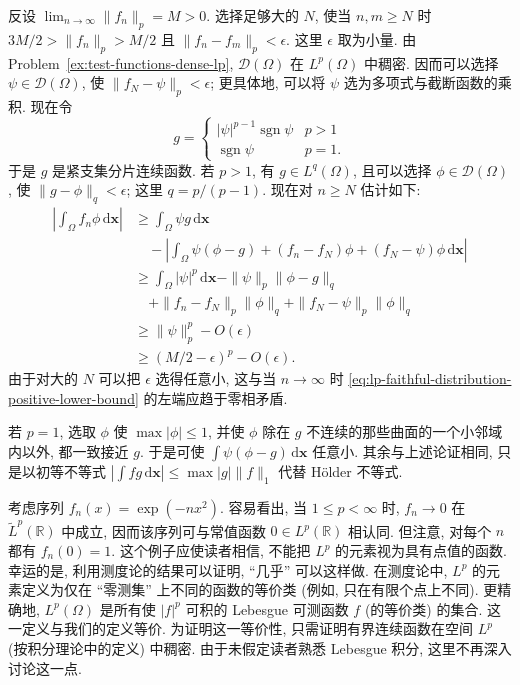 \begin{Proof}
反设 $\lim_{n\to\infty}\|f_n\|_p=M>0$. 选择足够大的 $N$, 使当 $n,m\geq N$ 时 $3M/2>\|f_n\|_p>M/2$ 且 $\|f_n-f_m\|_p<\epsilon$. 这里 $\epsilon$ 取为小量. 由 Problem~\ref{ex:test-functions-dense-lp}, $\mathcal{D}(\Omega)$ 在 $L^p(\Omega)$ 中稠密. 因而可以选择 $\psi\in\mathcal{D}(\Omega)$, 使 $\|f_N-\psi\|_p<\epsilon$; 更具体地, 可以将 $\psi$ 选为多项式与截断函数的乘积. 现在令
\begin{equation}\label{eq:lp-faithful-distribution-dual-test-function}
g=\begin{cases}|\psi|^{p-1}\operatorname{sgn}\psi&p>1\\\operatorname{sgn}\psi&p=1.\end{cases}
\end{equation}
于是 $g$ 是紧支集分片连续函数. 若 $p>1$, 有 $g\in L^q(\Omega)$, 且可以选择 $\phi\in\mathcal{D}(\Omega)$, 使 $\|g-\phi\|_q<\epsilon$; 这里 $q=p/(p-1)$. 现在对 $n\geq N$ 估计如下:
\begin{equation}\label{eq:lp-faithful-distribution-positive-lower-bound}
\begin{aligned}
\left|\int_\Omega f_n\phi\,\mathrm{d}\bm{x}\right|
&\geq\int_\Omega\psi g\,\mathrm{d}\bm{x}\\
&\quad-\left|\int_\Omega\psi(\phi-g)+(f_n-f_N)\phi+(f_N-\psi)\phi\,\mathrm{d}\bm{x}\right|\\
&\geq\int_\Omega|\psi|^p\,\mathrm{d}\bm{x}-\|\psi\|_p\|\phi-g\|_q\\
&\quad+\|f_n-f_N\|_p\|\phi\|_q+\|f_N-\psi\|_p\|\phi\|_q\\
&\geq\|\psi\|_p^p-O(\epsilon)\\
&\geq(M/2-\epsilon)^p-O(\epsilon).
\end{aligned}
\end{equation}
由于对大的 $N$ 可以把 $\epsilon$ 选得任意小, 这与当 $n\to\infty$ 时 \eqref{eq:lp-faithful-distribution-positive-lower-bound} 的左端应趋于零相矛盾.

若 $p=1$, 选取 $\phi$ 使 $\max|\phi|\leq1$, 并使 $\phi$ 除在 $g$ 不连续的那些曲面的一个小邻域内以外, 都一致接近 $g$. 于是可使 $\int\psi(\phi-g)\,\mathrm{d}\bm{x}$ 任意小. 其余与上述论证相同, 只是以初等不等式 $|\int fg\,\mathrm{d}\bm{x}|\leq\max|g|\|f\|_1$ 代替 Hölder 不等式.
\end{Proof}

\begin{Remark}
\label{rem:lp-point-values-and-measure-zero}
考虑序列 $f_n(x)=\exp(-nx^2)$. 容易看出, 当 $1\leq p<\infty$ 时, $f_n\to0$ 在 $\widetilde L^p(\mathbb{R})$ 中成立, 因而该序列可与常值函数 $0\in L^p(\mathbb{R})$ 相认同. 但注意, 对每个 $n$ 都有 $f_n(0)=1$. 这个例子应使读者相信, 不能把 $L^p$ 的元素视为具有点值的函数. 幸运的是, 利用测度论的结果可以证明, ``几乎'' 可以这样做. 在测度论中, $L^p$ 的元素定义为仅在 ``零测集'' 上不同的函数的等价类 (例如, 只在有限个点上不同). 更精确地, $L^p(\Omega)$ 是所有使 $|f|^p$ 可积的 Lebesgue 可测函数 $f$ (的等价类) 的集合. 这一定义与我们的定义等价. 为证明这一等价性, 只需证明有界连续函数在空间 $L^p$ (按积分理论中的定义) 中稠密. 由于未假定读者熟悉 Lebesgue 积分, 这里不再深入讨论这一点.
\end{Remark}

